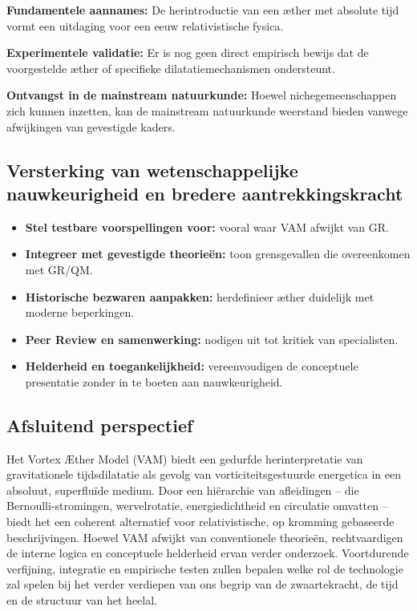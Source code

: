 \textbf{Fundamentele aannames:} De herintroductie van een æther met absolute tijd vormt een uitdaging voor een eeuw relativistische fysica.

\textbf{Experimentele validatie:} Er is nog geen direct empirisch bewijs dat de voorgestelde æther of specifieke dilatatiemechanismen ondersteunt.

\textbf{Ontvangst in de mainstream natuurkunde:} Hoewel nichegemeenschappen zich kunnen inzetten, kan de mainstream natuurkunde weerstand bieden vanwege afwijkingen van gevestigde kaders.

\subsection{Versterking van wetenschappelijke nauwkeurigheid en bredere aantrekkingskracht}

\begin{itemize}
\item \textbf{Stel testbare voorspellingen voor:} vooral waar VAM afwijkt van GR.
\item \textbf{Integreer met gevestigde theorieën:} toon grensgevallen die overeenkomen met GR/QM. \item \textbf{Historische bezwaren aanpakken:} herdefinieer æther duidelijk met moderne beperkingen.
\item \textbf{Peer Review en samenwerking:} nodigen uit tot kritiek van specialisten.
\item \textbf{Helderheid en toegankelijkheid:} vereenvoudigen de conceptuele presentatie zonder in te boeten aan nauwkeurigheid.
\end{itemize}

\subsection{Afsluitend perspectief}

Het Vortex Æther Model (VAM) biedt een gedurfde herinterpretatie van gravitationele tijdsdilatatie als gevolg van vorticiteitsgestuurde energetica in een absoluut, superfluïde medium. Door een hiërarchie van afleidingen – die Bernoulli-stromingen, wervelrotatie, energiedichtheid en circulatie omvatten – biedt het een coherent alternatief voor relativistische, op kromming gebaseerde beschrijvingen. Hoewel VAM afwijkt van conventionele theorieën, rechtvaardigen de interne logica en conceptuele helderheid ervan verder onderzoek. Voortdurende verfijning, integratie en empirische testen zullen bepalen welke rol de technologie zal spelen bij het verder verdiepen van ons begrip van de zwaartekracht, de tijd en de structuur van het heelal.